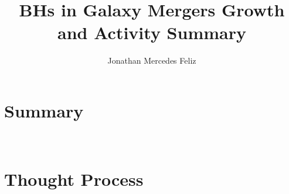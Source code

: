 \documentclass{article}
\title{BHs in Galaxy Mergers Growth and Activity Summary}
\author{Jonathan Mercedes Feliz}
\begin{document}
 
\maketitle{}
\section{Summary} 

\
\par 






\section{Thought Process}
\end{document}
